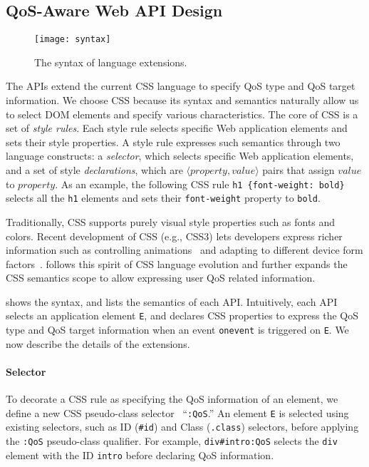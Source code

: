 \subsection{QoS-Aware Web API Design}
\label{sec:lang:spec:api}



\begin{figure}[t]
  \centering
  \texttt{[image: syntax]}
  \caption{The syntax of \greenweb language extensions.}
  \label{fig:syntax}
\end{figure}

The \greenweb APIs extend the current CSS language to specify QoS type and QoS target information. We choose CSS because its syntax and semantics naturally allow us to select DOM elements and specify various characteristics. The core of CSS is a set of \textit{style rules}. Each style rule selects specific Web application elements and sets their style properties. A style rule expresses such semantics through two language constructs: a \textit{selector}, which selects specific Web application elements, and a set of style \textit{declarations}, which are $\langle property, value \rangle$ pairs that assign $value$ to $property$. As an example, the following CSS rule \texttt{h1 \{font-weight: bold\}} selects all the \texttt{h1} elements and sets their \texttt{font-weight} property to \texttt{bold}.

Traditionally, CSS supports purely visual style properties such as fonts and colors. Recent development of CSS (e.g., CSS3) lets developers express richer information such as controlling animations~\cite{cssanimations} and adapting to different device form factors~\cite{css3mediaquery}. \greenweb follows this spirit of CSS language evolution and further expands the CSS semantics scope to allow expressing user QoS related information.

 shows the \greenweb syntax, and  lists the semantics of each API. Intuitively, each \greenweb API selects an application element \texttt{E}, and declares CSS properties to express the QoS type and QoS target information when an event \texttt{onevent} is triggered on \texttt{E}. We now describe the details of the \greenweb extensions.

\paragraph{Selector} To decorate a CSS rule as specifying the QoS information of an element, we define a new CSS pseudo-class selector~\cite{css_pseudo_class} ``\texttt{:QoS}.'' An element \texttt{E} is selected using existing selectors, such as ID (\texttt{\#id}) and Class (\texttt{.class}) selectors, before applying the \texttt{:QoS} pseudo-class qualifier. For example, \texttt{div\#intro:QoS} selects the \texttt{div} element with the ID \texttt{intro} before declaring QoS information.

